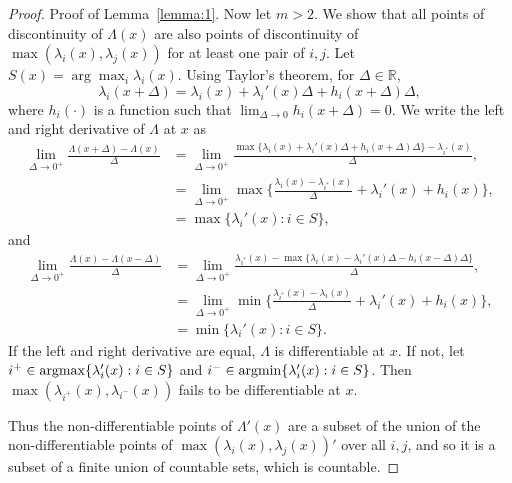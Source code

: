\documentclass[paper=letter]{scrartcl}
\newcommand{\argmax}{\operatornamewithlimits{argmax}}
\newcommand{\argmin}{\operatornamewithlimits{argmin}}
\begin{document}
\begin{proof}{Proof of Lemma~\ref{lemma:1}.}
Now let $m>2$. We show that all points of discontinuity of $\Lambda(x)$ are also points of discontinuity of $\max(\lambda_i(x), \lambda_j(x))$ for at least one pair of $i,j$.
Let $S(x) = \arg\max_i \lambda_i(x)$. 
Using Taylor's theorem, 
for $\Delta \in \mathbb{R}$,
\begin{equation*}
\lambda_i(x+\Delta) = \lambda_i(x) + \lambda_i'(x) \Delta + h_i(x+\Delta) \Delta,
\end{equation*}
where $h_i(\cdot)$ is a function such that $\lim_{\Delta \rightarrow 0} h_i(x+\Delta)=0$. We write the left and right derivative of $\Lambda$ at $x$ as
\begin{equation*}
\begin{split}
\lim_{\Delta \rightarrow 0^+} \frac{\Lambda(x+\Delta) - \Lambda(x)}{\Delta} &= \lim_{\Delta \rightarrow 0^+} \frac{\max \{ \lambda_i(x) + \lambda_i'(x) \Delta + h_i(x+\Delta) \Delta\} - \lambda_{i^*}(x)}{\Delta},\\
&= \lim_{\Delta \rightarrow 0^+} \max \{ \frac{\lambda_i(x) - \lambda_{i^*}(x)}{\Delta} + \lambda_i'(x) + h_i(x)\}, \\
&= \max \{\lambda_i'(x): i \in S \},
\end{split}
\end{equation*}
and
\begin{equation*}
\begin{split}
\lim_{\Delta \rightarrow 0^+} \frac{\Lambda(x) - \Lambda(x-\Delta)}{\Delta} &= \lim_{\Delta \rightarrow 0^+} \frac{\lambda_{i^*}(x) - \max \{ \lambda_i(x) - \lambda_i'(x) \Delta - h_i(x-\Delta) \Delta\}}{\Delta},\\
&= \lim_{\Delta \rightarrow 0^+} \min \{ \frac{\lambda_{i^*}(x) - \lambda_{i}(x)}{\Delta} + \lambda_i'(x) + h_i(x)\}, \\
&= \min \{\lambda_i'(x): i \in S \}.
\end{split}
\end{equation*}
If the left and right derivative are equal, $\Lambda$ is differentiable at $x$.
If not, let $i^+ \in \argmax\{ \lambda_i'(x) : i \in S\}$ and $i^- \in \argmin\{ \lambda_i'(x) : i \in S\}$.
Then $\max(\lambda_{i^+}(x),\lambda_{i^-}(x))$ fails to be differentiable at $x$.

Thus the non-differentiable points of $\Lambda'(x)$ are a subset of the union of the non-differentiable points of $\max(\lambda_i(x), \lambda_j(x))'$ over all $i,j$, and so it is a subset of a finite union of countable sets, which is countable.
\end{proof}
\end{document}

